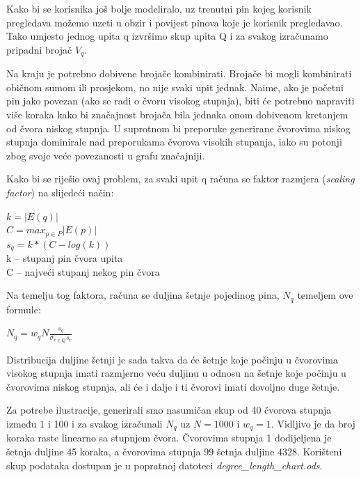 \documentclass[times, utf8, seminar]{fer}
\begin{document}
Kako bi se korisnika još bolje modeliralo, uz trenutni pin kojeg korisnik pregledava možemo uzeti u obzir i povijest pinova koje je korisnik pregledavao. Tako umjesto jednog upita q izvršimo skup upita Q i za svakog izračunamo pripadni brojač $V_q$.

Na kraju je potrebno dobivene brojače kombinirati. Brojače bi mogli kombinirati običnom sumom ili prosjekom, no nije svaki upit jednak. Naime, ako je početni pin jako povezan (ako se radi o čvoru visokog stupnja), biti će potrebno napraviti više koraka kako bi značajnost brojača bila jednaka onom dobivenom kretanjem od čvora niskog stupnja. U suprotnom bi preporuke generirane čvorovima niskog stupnja dominirale nad preporukama čvorova visokih stupanja, iako su potonji zbog svoje veće povezanosti u grafu značajniji.

Kako bi se riješio ovaj problem, za svaki upit q računa se faktor razmjera (\textit{scaling factor}) na slijedeći način:

\begin{centering}
		  $ k = |E(q)| $ \\
		  $ C = max_{p \in P}|E(p)| $ \\
		  $ s_q = k * (C - log(k)) $ \\
        k -- stupanj pin čvora upita \\
		  C -- najveći stupanj nekog pin čvora 
		  \par
\end{centering}

Na temelju tog faktora, računa se duljina šetnje pojedinog pina, $N_q$ temeljem ove formule:

\begin{centering}
	$ N_q = w_qN\frac{s_q}{\sigma_{r \in Q}s_r} $\par
\end{centering}

Distribucija duljine šetnji je sada takva da će šetnje koje počinju u čvorovima visokog stupnja imati razmjerno veću duljinu u odnosu na šetnje koje počinju u čvorovima niskog stupnja, ali će i dalje i ti čvorovi imati dovoljno duge šetnje.

Za potrebe ilustracije, generirali smo nasumičan skup od 40 čvorova stupnja između 1 i 100 i za svakog izračunali $N_q$ uz $N = 1000$ i $w_q = 1$. Vidljivo je da broj koraka raste linearno sa stupnjem čvora. Čvorovima stupnja 1 dodijeljena je šetnja duljine 45 koraka, a čvorovima stupnja 99 šetnja duljine 4328. Korišteni skup podataka dostupan je u popratnoj datoteci \textit{degree\_length\_chart.ods}.
\end{document}
